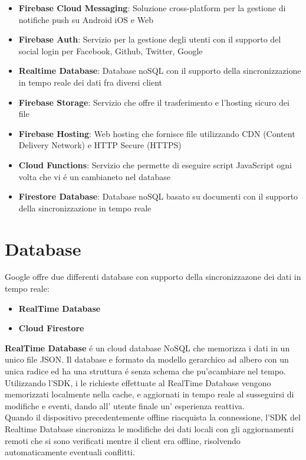 \begin{itemize}                         %
\item \textbf{Firebase Cloud Messaging}: Soluzione cross-platform per la gestione di notifiche push su Android iOS e Web

\item \textbf{Firebase Auth}: Servizio per la gestione degli utenti con il supporto del social login per Facebook, Github, Twitter, Google

\item \textbf{Realtime Database}: Database noSQL con il supporto della sincronizzazione in tempo reale dei dati fra diversi client

\item \textbf{Firebase Storage}: Servizio che offre il trasferimento e l'hosting sicuro dei file

\item \textbf{Firebase Hosting}: Web hosting che fornisce file utilizzando CDN (Content Delivery Network) e HTTP Secure (HTTPS)

\item \textbf{Cloud Functions}: Servizio che permette di eseguire script JavaScript  ogni volta che vi \'e un cambianeto nel database

\item \textbf{Firestore Database}: Database noSQL basato su documenti con il supporto della sincronizzazione in tempo reale
\end{itemize}




\section{Database}                 %
Google offre due differenti database con supporto della sincronizzazone dei dati in tempo reale:

\begin{itemize}
  \item \textbf{RealTime Database}
  \item \textbf{Cloud Firestore}
\end{itemize}


\textbf{RealTime Database} \'e un cloud database NoSQL che memorizza i dati in un unico file JSON. Il database e formato da modello gerarchico ad albero con un unica radice ed ha una struttura \'e senza schema che pu'\o cambiare nel tempo.\\
Utilizzando l'SDK, i le richieste effettuate al RealTime Database vengono memorizzati localmente nella cache, e aggiornati in tempo reale al susseguirsi di modifiche e eventi, dando all' utente finale un' esperienza reattiva.\\ Quando il dispositivo precedentemente offline riacquista la connessione, l'SDK del Realtime Database sincronizza le modifiche dei dati locali con gli aggiornamenti remoti che si sono verificati mentre il client era offline, risolvendo automaticamente eventuali conflitti.\\


